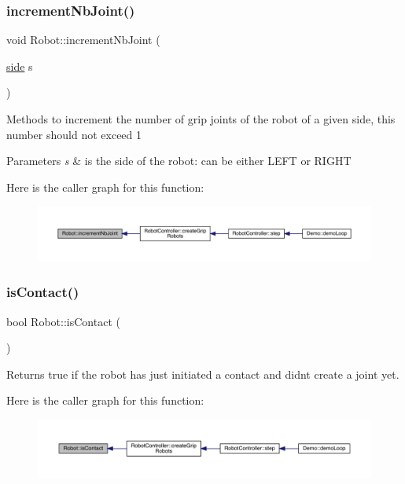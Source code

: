 \subsubsection{\texorpdfstring{increment\+Nb\+Joint()}{incrementNbJoint()}}
{\footnotesize\ttfamily void Robot\+::increment\+Nb\+Joint (\begin{DoxyParamCaption}\item[{\mbox{\hyperlink{_robot_8h_afc015eff6557e84151d2e53b94375445}{side}}}]{s }\end{DoxyParamCaption})}

Methods to increment the number of grip joints of the robot of a given side, this number should not exceed 1 
\begin{DoxyParams}{Parameters}
{\em s} & is the side of the robot\+: can be either L\+E\+FT or R\+I\+G\+HT \\
\hline
\end{DoxyParams}
Here is the caller graph for this function\+:\nopagebreak
\begin{figure}[H]
\begin{center}
\leavevmode
\includegraphics[width=350pt]{class_robot_af5b6b2dc9efa49654cf80abe298cc6f9_icgraph}
\end{center}
\end{figure}
\mbox{\label{class_robot_add038ac4b424821791781171a9a45de4}} 
\subsubsection{\texorpdfstring{is\+Contact()}{isContact()}}
{\footnotesize\ttfamily bool Robot\+::is\+Contact (\begin{DoxyParamCaption}{ }\end{DoxyParamCaption})}

\begin{DoxyReturn}{Returns}
true if the robot has just initiated a contact and didn\textquotesingle{}t create a joint yet. 
\end{DoxyReturn}
Here is the caller graph for this function\+:\nopagebreak
\begin{figure}[H]
\begin{center}
\leavevmode
\includegraphics[width=350pt]{class_robot_add038ac4b424821791781171a9a45de4_icgraph}
\end{center}
\end{figure}
\mbox{\label{class_robot_a156c0ecf0bed5e117335d4c1c12d2d06}} 
